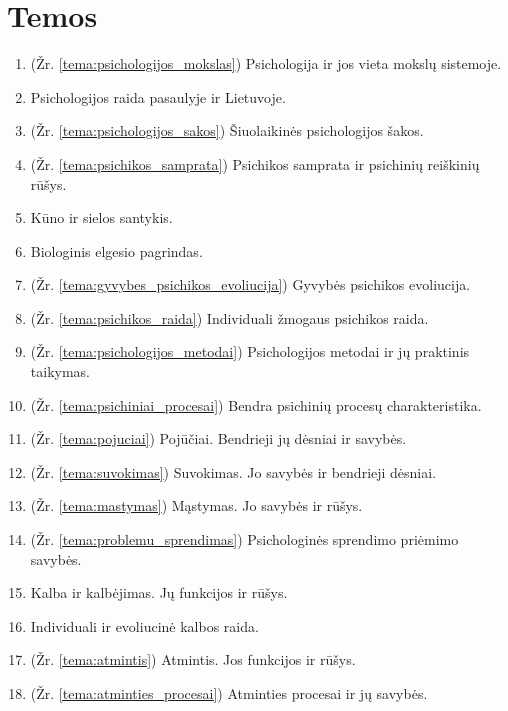 \chapter{Temos}

\begin{enumerate}
  \item \label{tema_01} (Žr. \ref{tema:psichologijos_mokslas})
    Psichologija ir jos vieta mokslų sistemoje.
  \item \label{tema_02} Psichologijos raida pasaulyje ir Lietuvoje.
  \item \label{tema_03} (Žr. \ref{tema:psichologijos_sakos})
    Šiuolaikinės psichologijos šakos.
  \item \label{tema_04} (Žr. \ref{tema:psichikos_samprata})
    Psichikos samprata ir psichinių reiškinių rūšys.
  \item \label{tema_05} Kūno ir sielos santykis.
  \item \label{tema_06} Biologinis elgesio pagrindas.
  \item \label{tema_07} (Žr. \ref{tema:gyvybes_psichikos_evoliucija})
  Gyvybės psichikos evoliucija.
  \item \label{tema_10} (Žr. \ref{tema:psichikos_raida})
  Individuali žmogaus psichikos raida.
  \item \label{tema_11} (Žr. \ref{tema:psichologijos_metodai})
  Psichologijos metodai ir jų praktinis taikymas.
  \item \label{tema_12} (Žr. \ref{tema:psichiniai_procesai})
    Bendra psichinių procesų charakteristika.
  \item \label{tema_13} (Žr. \ref{tema:pojuciai})
    Pojūčiai. Bendrieji jų dėsniai ir savybės.
  \item \label{tema_14} (Žr. \ref{tema:suvokimas})
    Suvokimas. Jo savybės ir bendrieji dėsniai.
  \item \label{tema_15} (Žr. \ref{tema:mastymas})
    Mąstymas. Jo savybės ir rūšys.
  \item \label{tema_16} (Žr. \ref{tema:problemu_sprendimas})
    Psichologinės sprendimo priėmimo savybės.
  \item \label{tema_17} Kalba ir kalbėjimas. Jų funkcijos ir rūšys.
  \item \label{tema_20} Individuali ir evoliucinė kalbos raida.
  \item \label{tema_21} (Žr. \ref{tema:atmintis})
    Atmintis. Jos funkcijos ir rūšys.
  \item \label{tema_22} (Žr. \ref{tema:atminties_procesai})
    Atminties procesai ir jų savybės.

\end{enumerate}
